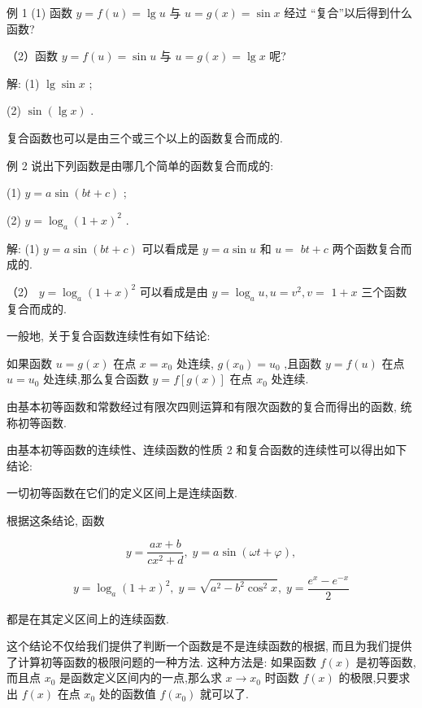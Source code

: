 \documentclass[lang=cn,newtx,10pt,scheme=chinese]{elegantbook}
\begin{document}
例 1 (1) 函数 \(y = f\left( u\right) = \lg u\) 与 \(u = g\left( x\right) = \sin x\) 经过 “复合”以后得到什么函数?

（2）函数 \(y = f\left( u\right) = \sin u\) 与 \(u = g\left( x\right) = \lg x\) 呢?

解: (1) \(\lg \sin x\) ;

(2) \(\sin \left( {\lg x}\right)\) .

复合函数也可以是由三个或三个以上的函数复合而成的.

例 2 说出下列函数是由哪几个简单的函数复合而成的:

(1) \(y = a\sin \left( {{bt} + c}\right)\) ;

(2) \(y = {\log }_{a}{\left( 1 + x\right) }^{2}\) .

解: (1) \(y = a\sin \left( {{bt} + c}\right)\) 可以看成是 \(y = a\sin u\) 和 \(u =\) \({bt} + c\) 两个函数复合而成的.

（2） \(y = {\log }_{a}{\left( 1 + x\right) }^{2}\) 可以看成是由 \(y = {\log }_{a}u,u = {v}^{2},v =\) \(1 + x\) 三个函数复合而成的.

一般地, 关于复合函数连续性有如下结论:
\begin{definition}[复合函数连续性] 

如果函数 \(u = g\left( x\right)\) 在点 \(x = {x}_{0}\) 处连续, \(g\left( {x}_{0}\right) = {u}_{0}\) ,且函数 \(y = f\left( u\right)\) 在点 \(u = {u}_{0}\) 处连续,那么复合函数 \(y = f\left\lbrack {g\left( x\right) }\right\rbrack\) 在点 \({x}_{0}\) 处连续.

\end{definition}

由基本初等函数和常数经过有限次四则运算和有限次函数的复合而得出的函数, 统称初等函数.

由基本初等函数的连续性、连续函数的性质 2 和复合函数的连续性可以得出如下结论:

\begin{conclusion}
	一切初等函数在它们的定义区间上是连续函数.
\end{conclusion}

根据这条结论, 函数

\[
y = \frac{{ax} + b}{c{x}^{2} + d},\;y = a\sin \left( {{\omega t} + \varphi }\right) ,
\]

\[
y = {\log }_{a}{\left( 1 + x\right) }^{2},\;y = \sqrt{{a}^{2} - {b}^{2}{\cos }^{2}x},\;y = \frac{{e}^{x} - {e}^{-x}}{2}
\]

都是在其定义区间上的连续函数.

这个结论不仅给我们提供了判断一个函数是不是连续函数的根据, 而且为我们提供了计算初等函数的极限问题的一种方法. 这种方法是: 如果函数 \(f\left( x\right)\) 是初等函数,而且点 \({x}_{0}\) 是函数定义区间内的一点,那么求 \(x \rightarrow {x}_{0}\) 时函数 \(f\left( x\right)\) 的极限,只要求出 \(f\left( x\right)\) 在点 \({x}_{0}\) 处的函数值 \(f\left( {x}_{0}\right)\) 就可以了.
\end{document}
